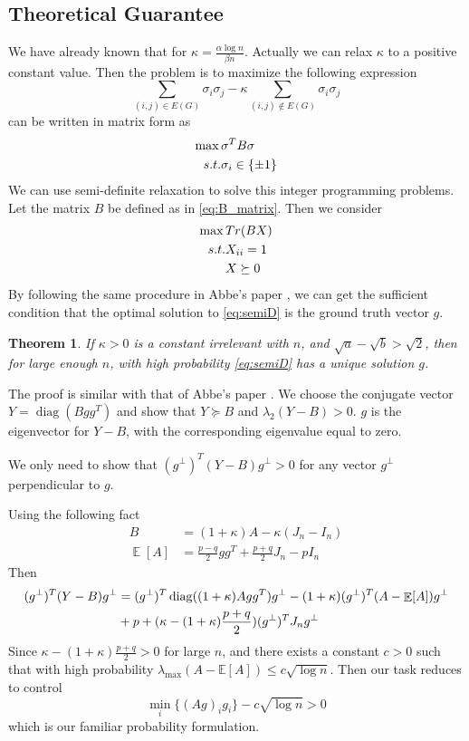 \documentclass{ctexart}
\newtheorem{theorem}{Theorem}
\DeclareMathOperator{\diag}{diag}
\DeclareMathOperator{\E}{\mathbb{E}}
\begin{document}
\subsection{Theoretical Guarantee}
We have already known that for $\kappa = \frac{\alpha \log n}{\beta n}$.
Actually we can relax $\kappa$ to a positive constant value.
Then the problem is to maximize
the following expression
\begin{equation}
\sum_{(i,j)\in E(G)} \sigma_i \sigma_j - \kappa \sum_{(i,j) \not\in E(G)} \sigma_i \sigma_j
\end{equation}
can be written in matrix form
as 
\begin{align}
\max \, & \sigma^T B \sigma \label{eq:sigmaB}\\
s.t. & \sigma_i \in \{\pm 1\} \notag
\end{align}
We can use semi-definite relaxation to solve this integer programming problems.
Let the matrix $B$ be defined as in \eqref{eq:B_matrix}.
Then we consider
\begin{align}
\max \,& Tr(BX) \label{eq:semiD}\\
s.t. & X_{ii} = 1 \notag \\
&  X \succeq 0 \notag
\end{align}
By following the same procedure in Abbe's paper \cite{abbe2015exact}, we can get the sufficient condition that the optimal solution
to \eqref{eq:semiD} is the ground truth vector $g$.
\begin{theorem}
If $\kappa > 0$ is a constant irrelevant with $n$, and $\sqrt{a} - \sqrt{b} > \sqrt{2}$, then for large enough $n$,
with high probability \eqref{eq:semiD} has a unique solution $g$.
\end{theorem}
The proof is similar with that of Abbe's paper \cite{abbe2015exact}.
We choose the conjugate vector $Y=\diag(Bgg^T)$ and show that 
 $Y \succeq B$ and $\lambda_2(Y-B)>0$.
$g$ is the eigenvector for $Y-B$, with the corresponding eigenvalue equal to zero.

We only need to show that $(g^{\perp})^T (Y-B)g^{\perp} >0$
for any vector $g^{\perp}$ perpendicular to $g$.

Using the following fact
\begin{align}
B &= (1+\kappa) A - \kappa(J_n - I_n) \\
\E[A] &= \frac{p-q}{2}gg^T + \frac{p+q}{2}J_n - pI_n
\end{align}
Then
\begin{align}
	(g^{\perp})^T(Y-B)g^{\perp} &= 
	(g^{\perp})^T\diag((1+\kappa)Agg^T) g^{\perp} 
	-(1+\kappa)(g^{\perp})^T(A-\E[A])g^{\perp}\notag\\
	&+p +(\kappa -(1+\kappa)\frac{p+q}{2})(g^{\perp})^TJ_ng^{\perp}
\end{align}
Since $\kappa -(1+\kappa)\frac{p+q}{2}>0$ for large $n$,
and there exists a constant $c>0$ such that with high
probability $\lambda_{\max}(A-\mathbb{E}[A]) \leq c\sqrt{\log n}$.
Then our task reduces to control
\begin{equation*}
	\min_{i} \{(Ag)_i g_i\} - c \sqrt{\log n} > 0
\end{equation*}
which is our familiar probability formulation.
\end{document}
